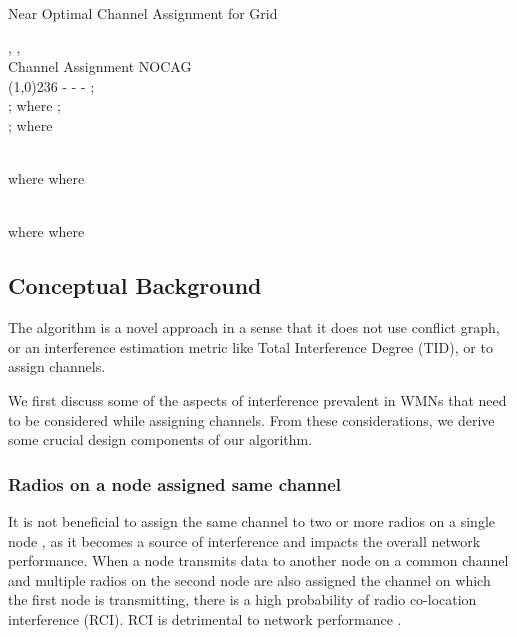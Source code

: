 \documentclass[conference]{IEEEtran}
\begin{document}
\renewcommand{\algorithmicrequire}{\textbf{Input:}}
\renewcommand{\algorithmicensure}{\textbf{Output:}}
\begin{algorithm}[htb!] 
\caption{Near Optimal Channel Assignment for Grid}
\label{radcol}
\begin{algorithmic}[1]
{\fontsize{9}{10}
\REQUIRE , ,\\
      \hspace{.35cm}   
\ENSURE Channel Assignment NOCAG \\
\line(1,0){236}
\FOR {}
\FOR {}
\IF {}
\STATE 
 \ENDIF
\IF	{   \&\&   }
	\STATE     -  -  
	\STATE    - 
	\IF{}
	    \STATE     ;\\     ; where   
	\ELSE 
	    \STATE     ; \\    ; where   
	\ENDIF
	
 \ENDIF \\
 \IF	{    \&\&    }
	\STATE   {}   
	\IF{}
	  \STATE      where    
	\ELSE
	  \STATE      where   
	\ENDIF
	
	
 \ENDIF\\
 \IF	{    \&\&   }
	\STATE   {}   
	\IF{}
	  \STATE      where    
	\ELSE
	  \STATE       where    
	\ENDIF
 \ENDIF\\
 \IF	{    \&\&    }
	\STATE        
	\STATE        
	\STATE 
 \ENDIF
\ENDFOR
\ENDFOR
}
\end{algorithmic}
\end{algorithm}


\subsection{Conceptual Background }

The algorithm is a novel approach in a sense that it does not use conflict graph, or an interference estimation metric like 
Total Interference Degree (TID), or  \cite{kala2015reliable} 
to assign channels.  

We first discuss some of the aspects of interference prevalent in WMNs that need to be considered while assigning channels. 
From these considerations, we derive some crucial design components of our algorithm.

\subsubsection{Radios  on a node assigned same channel}                                      
It is not beneficial to assign the same channel to two or more radios on a single node \cite{kala2016interference},
as it becomes a source of interference and impacts the overall network performance. 
When a node transmits data to another node on a common channel and multiple radios on the  second node are also assigned the channel on which the first
node is transmitting, there is a high probability of radio co-location interference (RCI). RCI is detrimental to network performance \cite{kala2016interference}. 
\end{document}

